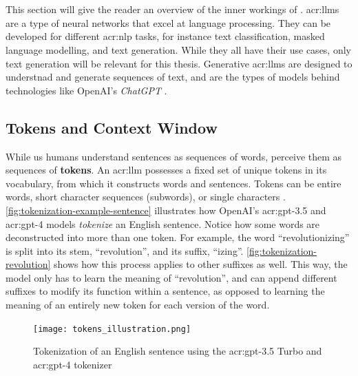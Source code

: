 \section[Large Language Models]{}
\label{sec:llms}

This section will give the reader an overview of the inner workings of . \glspl{acr:llm} are a type of neural networks that excel at language processing. They can be developed for different \gls{acr:nlp} tasks, for instance text classification, masked language modelling, and text generation. While they all have their use cases, only text generation will be relevant for this thesis. Generative \glspl{acr:llm} are designed to understnad and generate sequences of text, and are the types of models behind technologies like OpenAI's \textit{ChatGPT} \citep{openaiIntroducingChatGPT2022}.

\subsection{Tokens and Context Window}
\label{subsec:core-concepts}

While us humans understand sentences as sequences of words,  perceive them as sequences of \textbf{tokens}. An \acrshort{acr:llm} possesses a fixed set of unique tokens in its vocabulary, from which it constructs words and sentences. Tokens can be entire words, short character sequences (subwords), or single characters \cite{aliTokenizerChoiceLLM2024}. \autoref{fig:tokenization-example-sentence} illustrates how OpenAI's \acrshort{acr:gpt}-3.5 and \acrshort{acr:gpt}-4 models \textit{tokenize} an English sentence. Notice how some words are deconstructed into more than one token. For example, the word \enquote{revolutionizing} is split into its stem, \enquote{revolution}, and its suffix, \enquote{izing}. \autoref{fig:tokenization-revolution} shows how this process applies to other suffixes as well. This way, the model only has to learn the meaning of \enquote{revolution}, and can append different suffixes to modify its function within a sentence, as opposed to learning the meaning of an entirely new token for each version of the word.

\begin{figure}[htp]
    \centering
    \texttt{[image: tokens\_illustration.png]}
    \caption{Tokenization of an English sentence using the \acrshort{acr:gpt}-3.5 Turbo and \acrshort{acr:gpt}-4 tokenizer}
    \label{fig:tokenization-example-sentence}
\end{figure}

